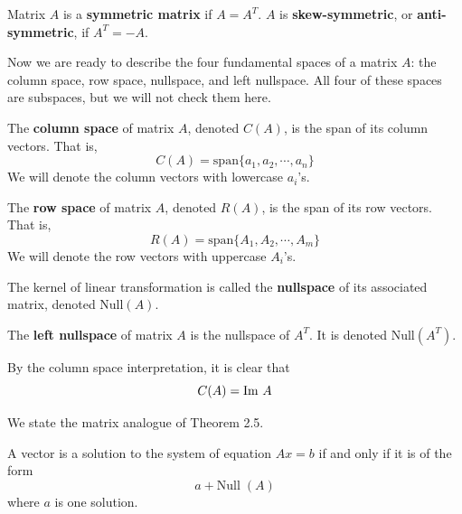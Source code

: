   \begin{definition}
    Matrix $A$ is a \textbf{symmetric matrix} if $A = A^T$. $A$ is \textbf{skew-symmetric}, or \textbf{anti-symmetric}, if $A^T = - A$. 
  \end{definition}

  Now we are ready to describe the four fundamental spaces of a matrix $A$: the column space, row space, nullspace, and left nullspace. All four of these spaces are subspaces, but we will not check them here. 

  \begin{definition}
    The \textbf{column space} of matrix $A$, denoted $C(A)$, is the span of its column vectors. That is, 
    \begin{equation}
      C(A) = \text{span}\{ a_1, a_2, \cdots, a_n\}
    \end{equation}
    We will denote the column vectors with lowercase $a_i$'s.
  \end{definition}

  \begin{definition}
    The \textbf{row space} of matrix $A$, denoted $R(A)$, is the span of its row vectors. That is, 
    \begin{equation}
      R(A) = \text{span}\{ A_1, A_2, \cdots, A_m\}
    \end{equation}
    We will denote the row vectors with uppercase $A_i$'s. 
  \end{definition}

  \begin{definition}
    The kernel of linear transformation is called the \textbf{nullspace} of its associated matrix, denoted Null$(A)$. 
  \end{definition}

  \begin{definition}
    The \textbf{left nullspace} of matrix $A$ is the nullspace of $A^T$. It is denoted Null$(A^T)$. 
  \end{definition}

  \begin{theorem}
    By the column space interpretation, it is clear that
    \begin{equation}
      C(A) = \operatorname{Im} \, A
    \end{equation}
  \end{theorem}

  We state the matrix analogue of Theorem 2.5. 

  \begin{theorem}
    A vector is a solution to the system of equation $A x = b$ if and only if it is of the form 
    \begin{equation}
    a + \text{Null}\; (A)
    \end{equation}
    where $a$ is one solution. 
  \end{theorem}


